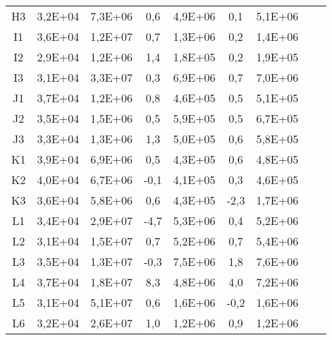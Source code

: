 \begin{center}
\begin{longtable}{ccccccccc}
H3    & 3,2E+04 & 7,3E+06 & 0,6   & 4,9E+06 & 0,1   & 5,1E+06 \\
I1    & 3,6E+04 & 1,2E+07 & 0,7   & 1,3E+06 & 0,2   & 1,4E+06 \\
I2    & 2,9E+04 & 1,2E+06 & 1,4   & 1,8E+05 & 0,2   & 1,9E+05 \\
I3    & 3,1E+04 & 3,3E+07 & 0,3   & 6,9E+06 & 0,7   & 7,0E+06 \\
J1    & 3,7E+04 & 1,2E+06 & 0,8   & 4,6E+05 & 0,5   & 5,1E+05 \\
J2    & 3,5E+04 & 1,5E+06 & 0,5   & 5,9E+05 & 0,5   & 6,7E+05 \\
J3    & 3,3E+04 & 1,3E+06 & 1,3   & 5,0E+05 & 0,6   & 5,8E+05 \\
K1    & 3,9E+04 & 6,9E+06 & 0,5   & 4,3E+05 & 0,6   & 4,8E+05 \\
K2    & 4,0E+04 & 6,7E+06 & -0,1  & 4,1E+05 & 0,3   & 4,6E+05 \\
K3    & 3,6E+04 & 5,8E+06 & 0,6   & 4,3E+05 & -2,3  & 1,7E+06 \\
L1    & 3,4E+04 & 2,9E+07 & -4,7  & 5,3E+06 & 0,4   & 5,2E+06 \\
L2    & 3,1E+04 & 1,5E+07 & 0,7   & 5,2E+06 & 0,7   & 5,4E+06 \\
L3    & 3,5E+04 & 1,3E+07 & -0,3  & 7,5E+06 & 1,8   & 7,6E+06 \\
L4    & 3,7E+04 & 1,8E+07 & 8,3   & 4,8E+06 & 4,0   & 7,2E+06 \\
L5    & 3,1E+04 & 5,1E+07 & 0,6   & 1,6E+06 & -0,2  & 1,6E+06 \\
L6    & 3,2E+04 & 2,6E+07 & 1,0   & 1,2E+06 & 0,9   & 1,2E+06 \\
\end{longtable}
\end{center}

